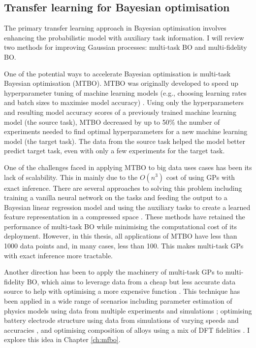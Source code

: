 \subsection{Transfer learning for Bayesian optimisation}

The primary transfer learning approach in Bayesian optimisation involves enhancing the probabilistic model with auxiliary task information. I will review two methods for improving Gaussian processes: multi-task BO and multi-fidelity BO.

One of the potential ways to accelerate Bayesian optimisation is multi-task Bayesian optimisation (MTBO). MTBO was originally developed to speed up hyperparameter tuning of machine learning models (e.g., choosing learning rates and batch sizes to maximise model accuracy) \cite{Swersky2013}. Using only the hyperparameters and resulting model accuracy scores of a previously trained machine learning model (the source task),  MTBO decreased by up to 50\% the number of experiments needed to find optimal hyperparameters for a new machine learning model (the target task).  The data from the source task helped the model better predict target task, even with only a few experiments for the target task. 

One of the challenges faced in applying MTBO to big data uses cases has been its lack of scalability. This in mainly due to the $O(n^3)$ cost of using GPs with exact inference. There are several approaches to solving this problem including training a vanilla neural network on the tasks and feeding the output to a Bayesian linear regression model \cite{Perrone2018} and using the auxiliary tasks to create a learned feature representation in a compressed space \cite{Hakhamaneshi2021}. These methods have retained the performance of multi-task BO while minimising the computational cost of its deployment. However, in this thesis, all applications of MTBO have less than 1000 data points and, in many cases, less than 100. This makes multi-task GPs with exact inference more tractable.

Another direction has been to apply the machinery of multi-task GPs to multi-fidelity BO, which aims to leverage data from a cheap but less accurate data source to help with optimising a more expensive function \cite{Huang2006, Forrester2007}. This technique has been applied in a wide range of scenarios including parameter estimation of physics models using data from multiple experiments and simulations \cite{Perdikaris2016}; optimising battery electrode structure using data from simulations of varying speeds and accuracies \cite{Pan2017, Folch2023}, and optimising composition of alloys using a mix of DFT fidelities \cite{Tran2020}. I explore this idea in Chapter \ref{ch:mfbo}.

